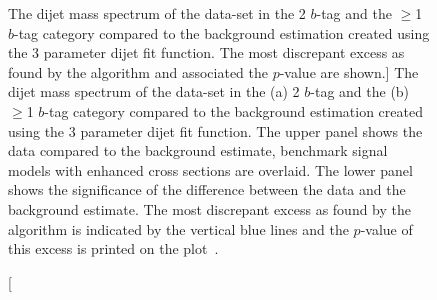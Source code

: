 \begin{figure}[!htb]
  \begin{center}
    \captionsetup[subfigure]{aboveskip=0pt,justification=centering}
  \end{center}
  \vspace{-1em}
  \caption
      [The dijet mass spectrum of the \summer{} data-set in the 2 $b$-tag and the $\geq$1 $b$-tag category
        compared to the background estimation created using the 3 parameter dijet fit function.
        The most discrepant excess as found by the \bh{} algorithm and associated the \mbox{$p$-value} are shown.]
      {The dijet mass spectrum of the  \summer{} data-set in the (a) 2 $b$-tag and the (b) $\geq$1 $b$-tag category
        compared to the background estimation created using the 3 parameter dijet fit function.
        The upper panel shows the data compared to the background estimate,
        benchmark signal models with enhanced cross sections are overlaid.
        The lower panel shows the significance of the difference between the data and the background estimate.
        The most discrepant excess as found by the \bh{} algorithm is indicated by the vertical blue lines and the \mbox{$p$-value} of this excess is printed on the plot~\cite{dibjet-ichep_conf}.
          }
  \label{fig:bkg-summer_searchPhase}
\end{figure}


